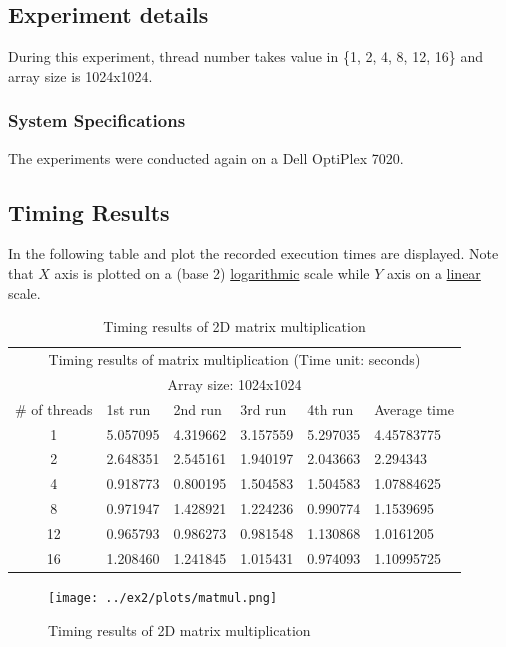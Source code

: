 \documentclass{article}
\begin{document}
\subsection{Experiment details}
During this experiment, thread number takes value in \{1, 2, 4, 8, 12, 16\} and array
size is 1024x1024.

\subsubsection{System Specifications}
The experiments were conducted again on a Dell OptiPlex 7020.


\subsection{Timing Results}
In the following table and plot the recorded execution times are displayed.
Note that $X$ axis is plotted on a (base 2) \underline{logarithmic} scale while
$Y$ axis on a \underline{linear} scale.


\begin{table}[htbp]
  \centering
    \begin{tabular}{|c||l|l|l|l||l|} 
    \hline
    \multicolumn{6}{|c|}{Timing results of matrix multiplication (Time unit: seconds)} \\
    \multicolumn{6}{|c|}{Array size: 1024x1024} \\
    \hline
   \# of threads & 1st run & 2nd run & 3rd run & 4th run & Average time\\ [0.5ex] 
    \hline\hline
    1 & 5.057095 & 4.319662 & 3.157559 & 5.297035 & 4.45783775 \\ 
    \hline
    2 & 2.648351 & 2.545161 & 1.940197 & 2.043663 & 2.294343 \\
    \hline
    4 & 0.918773 & 0.800195 & 1.504583 & 1.504583 & 1.07884625 \\
    \hline
    8 & 0.971947 & 1.428921 & 1.224236 & 0.990774 & 1.1539695 \\
    \hline
    12 & 0.965793 & 0.986273 & 0.981548 & 1.130868 & 1.0161205 \\
    \hline
    16 & 1.208460 & 1.241845 & 1.015431 & 0.974093 & 1.10995725 \\ [1ex]
    \hline
    \end{tabular}
  \caption{Timing results of 2D matrix multiplication}
\end{table}


\begin{figure}[htbp]
  \centering
  \texttt{[image: ../ex2/plots/matmul.png]}
  \caption{Timing results of 2D matrix multiplication}
\end{figure}
\end{document}
